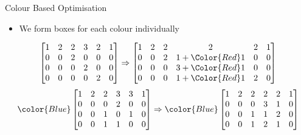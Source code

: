 \begin{frame}{Colour Based Optimisation}
	\begin{itemize}
		\item We form boxes for each colour individually
	\end{itemize}
	\begin{equation*}

     \begin{bmatrix}
     1&2&2&3&2&1\\
  0&0&2&0&0&0\\
  0&0&0&2&0&0\\
  0&0&0&0&2&0
     \end{bmatrix} \Rightarrow
     \begin{bmatrix}
     1&2&2&2&2&1\\
	     0&0&2&1+\Color{Red}1&0&0\\
	     0&0&0&3+\Color{Red}1&0&0\\
	     0&0&0&1+\Color{Red}1&2&0
     \end{bmatrix}


	\end{equation*}
	\begin{equation*}
\color{Blue}
    \begin{bmatrix}
        1&2&2&3&3&1\\
        0&0&0&2&0&0\\
        0&0&1&0&1&0\\
        0&0&1&1&0&0\\
    \end{bmatrix}\Rightarrow
\color{Blue}
    \begin{bmatrix}
        1&2&2&2&2&1\\
        0&0&0&3&1&0\\
        0&0&1&1&2&0\\
        0&0&1&2&1&0\\
    \end{bmatrix}		
	\end{equation*}

\end{frame}
